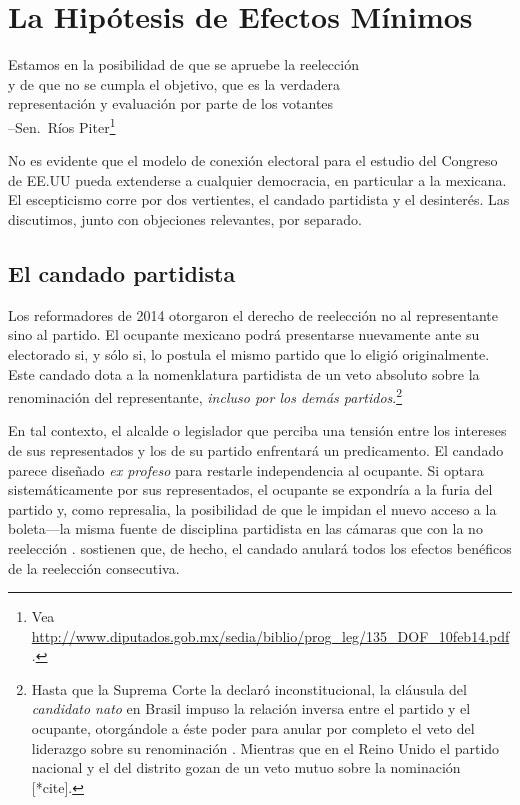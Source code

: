 \documentclass[letter,12pt]{article}
\begin{document}
\section{La Hipótesis de Efectos Mínimos}

\begin{center}
\begin{singlespacing}
  Estamos en la posibilidad de que se apruebe la reelección\\
  y de que no se cumpla el objetivo, que es la verdadera\\
  representación y evaluación por parte de los votantes\\
  --Sen.\ Ríos Piter\footnote{Vea \url{http://www.diputados.gob.mx/sedia/biblio/prog_leg/135_DOF_10feb14.pdf}.}
\end{singlespacing}
\end{center}

\noindent No es evidente que el modelo de conexión electoral para el estudio del Congreso de EE.UU pueda extenderse a cualquier democracia, en particular a la mexicana. El escepticismo corre por dos vertientes, el candado partidista y el desinterés. Las discutimos, junto con objeciones relevantes, por separado.

\subsection{El candado partidista}

\noindent Los reformadores de 2014 otorgaron el derecho de reelección no al representante sino al partido. El ocupante mexicano podrá presentarse nuevamente ante su electorado si, y sólo si, lo postula el mismo partido que lo eligió originalmente. Este candado dota a la nomenklatura partidista de un veto absoluto sobre la renominación del representante, \emph{incluso por los demás partidos}.\footnote{Hasta que la Suprema Corte la declaró inconstitucional, la cláusula del \emph{candidato nato} en Brasil impuso la relación inversa entre el partido y el ocupante, otorgándole a éste poder para anular por completo el veto del liderazgo sobre su renominación \citep{mainwaring.1991}. Mientras que en el Reino Unido el partido nacional y el del distrito gozan de un veto mutuo sobre la nominación [*cite].}

En tal contexto, el alcalde o legislador que perciba una tensión entre los intereses de sus representados y los de su partido enfrentará un predicamento. El candado parece diseñado \emph{ex profeso} para restarle independencia al ocupante. Si optara sistemáticamente por sus representados, el ocupante se expondría a la furia del partido y, como represalia, la posibilidad de que le impidan el nuevo acceso a la boleta---la misma fuente de disciplina partidista en las cámaras que con la no reelección \citep{weldon.1997esp}. \citet{merinoFierroZarkin2013Blog} sostienen que, de hecho, el candado anulará todos los efectos benéficos de la reelección consecutiva. 
\end{document}
